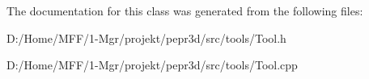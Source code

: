 The documentation for this class was generated from the following files\+:\begin{DoxyCompactItemize}
\item 
D\+:/\+Home/\+M\+F\+F/1-\/\+Mgr/projekt/pepr3d/src/tools/Tool.\+h\item 
D\+:/\+Home/\+M\+F\+F/1-\/\+Mgr/projekt/pepr3d/src/tools/Tool.\+cpp\end{DoxyCompactItemize}
